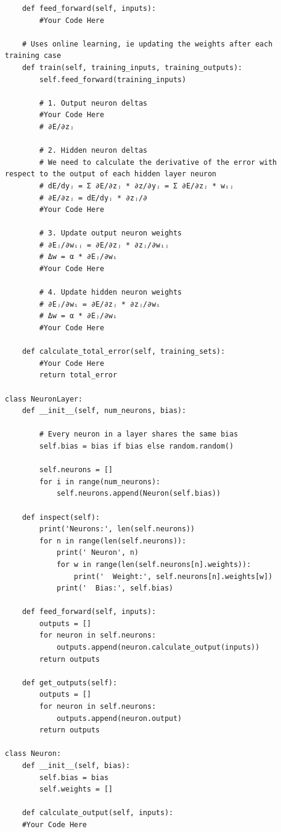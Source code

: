 \documentclass[a4paper, 11pt]{article}
\begin{document}
\begin{enumerate}
\begin{lstlisting}
    def feed_forward(self, inputs):
        #Your Code Here

    # Uses online learning, ie updating the weights after each training case
    def train(self, training_inputs, training_outputs):
        self.feed_forward(training_inputs)

        # 1. Output neuron deltas
        #Your Code Here
        # ∂E/∂zⱼ

        # 2. Hidden neuron deltas
        # We need to calculate the derivative of the error with respect to the output of each hidden layer neuron
        # dE/dyⱼ = Σ ∂E/∂zⱼ * ∂z/∂yⱼ = Σ ∂E/∂zⱼ * wᵢⱼ
        # ∂E/∂zⱼ = dE/dyⱼ * ∂zⱼ/∂
        #Your Code Here

        # 3. Update output neuron weights
        # ∂Eⱼ/∂wᵢⱼ = ∂E/∂zⱼ * ∂zⱼ/∂wᵢⱼ
        # Δw = α * ∂Eⱼ/∂wᵢ
        #Your Code Here

        # 4. Update hidden neuron weights
        # ∂Eⱼ/∂wᵢ = ∂E/∂zⱼ * ∂zⱼ/∂wᵢ
        # Δw = α * ∂Eⱼ/∂wᵢ
        #Your Code Here

    def calculate_total_error(self, training_sets):
        #Your Code Here
        return total_error

class NeuronLayer:
    def __init__(self, num_neurons, bias):

        # Every neuron in a layer shares the same bias
        self.bias = bias if bias else random.random()

        self.neurons = []
        for i in range(num_neurons):
            self.neurons.append(Neuron(self.bias))

    def inspect(self):
        print('Neurons:', len(self.neurons))
        for n in range(len(self.neurons)):
            print(' Neuron', n)
            for w in range(len(self.neurons[n].weights)):
                print('  Weight:', self.neurons[n].weights[w])
            print('  Bias:', self.bias)

    def feed_forward(self, inputs):
        outputs = []
        for neuron in self.neurons:
            outputs.append(neuron.calculate_output(inputs))
        return outputs

    def get_outputs(self):
        outputs = []
        for neuron in self.neurons:
            outputs.append(neuron.output)
        return outputs

class Neuron:
    def __init__(self, bias):
        self.bias = bias
        self.weights = []

    def calculate_output(self, inputs):
    #Your Code Here


\end{lstlisting}
\end{enumerate}
\end{document}
